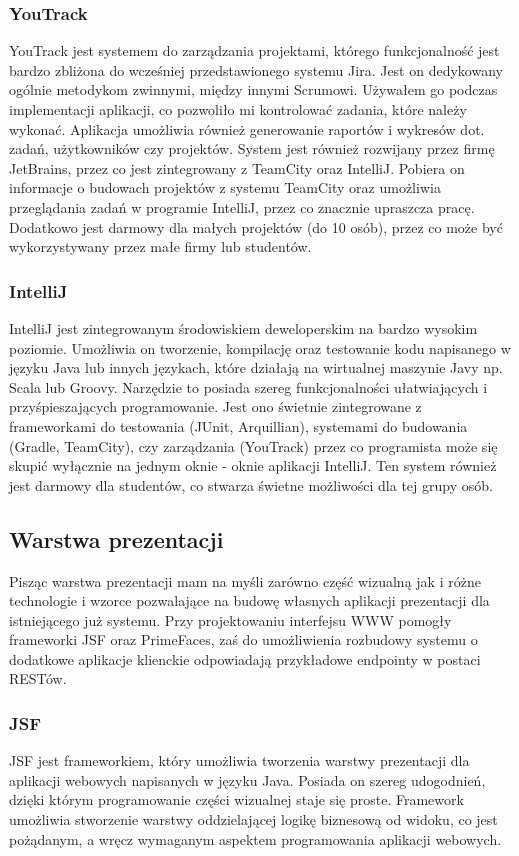 \subsubsection{YouTrack}
YouTrack jest systemem do zarządzania projektami, którego funkcjonalność jest bardzo zbliżona do wcześniej przedstawionego systemu Jira. Jest on dedykowany ogólnie metodykom zwinnymi, między innymi Scrumowi. Używałem go podczas implementacji aplikacji, co pozwoliło mi kontrolować zadania, które należy wykonać. Aplikacja umożliwia również generowanie raportów i wykresów dot. zadań, użytkowników czy projektów. System jest również rozwijany przez firmę JetBrains, przez co jest zintegrowany z TeamCity oraz IntelliJ. Pobiera on informacje o budowach projektów z systemu TeamCity oraz umożliwia przeglądania zadań w programie IntelliJ, przez co znacznie upraszcza pracę. Dodatkowo jest darmowy dla małych projektów (do 10 osób), przez co może być wykorzystywany przez małe firmy lub studentów.

\subsubsection{IntelliJ}
IntelliJ jest zintegrowanym środowiskiem deweloperskim na bardzo wysokim poziomie. Umożliwia on tworzenie, kompilację oraz testowanie kodu napisanego w języku Java lub innych językach, które działają na wirtualnej maszynie Javy np. Scala lub Groovy. Narzędzie to posiada szereg funkcjonalności ułatwiających i przyśpieszających programowanie. Jest ono świetnie zintegrowane z frameworkami do testowania (JUnit, Arquillian), systemami do budowania (Gradle, TeamCity), czy zarządzania (YouTrack) przez co programista może się skupić wyłącznie na jednym oknie - oknie aplikacji IntelliJ. Ten system również jest darmowy dla studentów, co stwarza świetne możliwości dla tej grupy osób.


\subsection{Warstwa prezentacji}
Pisząc warstwa prezentacji mam na myśli zarówno część wizualną jak i różne technologie i wzorce pozwalające na budowę własnych aplikacji prezentacji dla istniejącego już systemu. Przy projektowaniu interfejsu WWW pomogły frameworki JSF oraz PrimeFaces, zaś do umożliwienia rozbudowy systemu o dodatkowe aplikacje klienckie odpowiadają przykładowe endpointy w postaci RESTów.

\subsubsection{JSF}
JSF jest frameworkiem, który umożliwia tworzenia warstwy prezentacji dla aplikacji webowych napisanych w języku Java. Posiada on szereg udogodnień, dzięki którym programowanie części wizualnej staje się proste. Framework umożliwia stworzenie warstwy oddzielającej logikę biznesową od widoku, co jest pożądanym, a wręcz wymaganym aspektem programowania aplikacji webowych.

